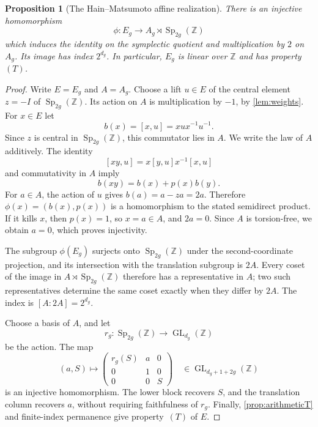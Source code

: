 \documentclass[11pt,a4paper]{article}
\newtheorem{proposition}[theorem]{Proposition}
\theoremstyle{definition}
\newcommand{\Z}{\mathbb Z}
\newcommand{\Sp}{\operatorname{Sp}}
\newcommand{\GL}{\operatorname{GL}}
\newcommand{\rt}{(T)}
\begin{document}
\begin{proposition}[The Hain--Matsumoto affine realization]
\label{prop:affinequotient}
There is an injective homomorphism
\[
 \phi:E_g\longrightarrow A_g\rtimes\Sp_{2g}(\Z)
\]
which induces the identity on the symplectic quotient and
multiplication by \(2\) on \(A_g\). Its image has index
\(2^{d_g}\). In particular, \(E_g\) is linear over \(\Z\)
and has property~\(\rt\).
\end{proposition}
\begin{proof}
Write \(E=E_g\) and \(A=A_g\).
Choose a lift \(u\in E\) of the central element \(z=-I\)
of \(\Sp_{2g}(\Z)\). Its action on \(A\) is multiplication by
\(-1\), by \cref{lem:weights}. For \(x\in E\) let
\[
 b(x)=[x,u]=xux^{-1}u^{-1}.
\]
Since \(z\) is central in \(\Sp_{2g}(\Z)\), this commutator lies
in \(A\). We write the law of \(A\) additively. The identity
\[
 [xy,u]=x[y,u]x^{-1}[x,u]
\]
and commutativity in \(A\) imply
\[
 b(xy)=b(x)+p(x)b(y).
\]
For \(a\in A\), the action of \(u\) gives
\(b(a)=a-za=2a\). Therefore
\(\phi(x)=(b(x),p(x))\) is a homomorphism to the stated
semidirect product. If it kills \(x\), then \(p(x)=1\),
so \(x=a\in A\), and \(2a=0\). Since \(A\) is torsion-free,
we obtain \(a=0\), which proves injectivity.

The subgroup \(\phi(E_g)\) surjects onto \(\Sp_{2g}(\Z)\) under the second-coordinate projection, and its intersection
with the translation subgroup is \(2A\). Every coset of the
image in \(A\rtimes\Sp_{2g}(\Z)\) therefore has a representative
in \(A\); two such representatives determine the same coset
exactly when they differ by \(2A\). The index is
\([A:2A]=2^{d_g}\).

Choose a basis of \(A\), and
let \[r_g:\Sp_{2g}(\Z)\to\GL_{d_g}(\Z)\] 
be the action. The map
\[
 (a,S)\longmapsto
 \begin{pmatrix}
  r_g(S)&a&0\\
  0&1&0\\
  0&0&S
 \end{pmatrix}
 \quad\in\GL_{d_g+1+2g}(\Z)
\]
is an injective homomorphism. The lower block recovers \(S\),
and the translation column recovers \(a\), without requiring
faithfulness of \(r_g\). Finally, \cref{prop:arithmeticT}
and finite-index permanence give property~\(\rt\) of \(E\).
\end{proof}
\end{document}
